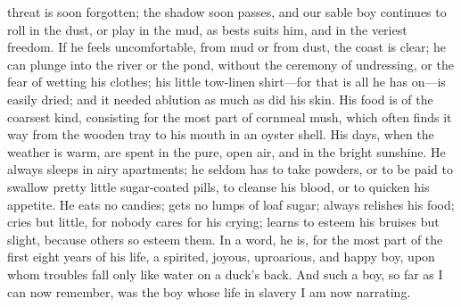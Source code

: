 threat is soon forgotten; the shadow soon passes, and our sable boy
continues to roll in the dust, or play in the mud, as bests suits him,
and in the veriest freedom. If he feels uncomfortable, from mud or from
dust, the coast is clear; he can plunge into the river or the pond,
without the ceremony of undressing, or the fear
{\protect\hypertarget{42}{}{}}of wetting his clothes; his little
tow-linen shirt---for that is all he has on---is easily dried; and it
needed ablution as much as did his skin. His food is of the coarsest
kind, consisting for the most part of cornmeal mush, which often finds
it way from the wooden tray to his mouth in an oyster shell. His days,
when the weather is warm, are spent in the pure, open air, and in the
bright sunshine. He always sleeps in airy apartments; he seldom has to
take powders, or to be paid to swallow pretty little sugar-coated pills,
to cleanse his blood, or to quicken his appetite. He eats no candies;
gets no lumps of loaf sugar; always relishes his food; cries but little,
for nobody cares for his crying; learns to esteem his bruises but
slight, because others so esteem them. In a word, he is, for the most
part of the first eight years of his life, a spirited, joyous,
uproarious, and happy boy, upon whom troubles fall only like water on a
duck's back. And such a boy, so far as I can now remember, was the boy
whose life in slavery I am now narrating.

~

